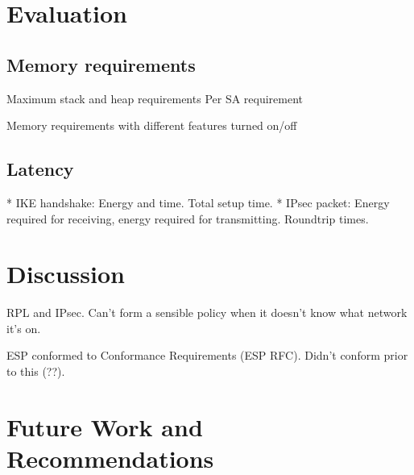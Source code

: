\documentclass[final,a4paper,twoside,11pt,onecolumn]{report}
\begin{document}
\chapter{Evaluation}
\label{cha:eval}

\section{Memory requirements}
Maximum stack and heap requirements
Per SA requirement

Memory requirements with different features turned on/off

\section{Latency}
* IKE handshake: Energy and time. Total setup time.
* IPsec packet: Energy required for receiving, energy required for transmitting. Roundtrip times.




\chapter{Discussion}
RPL and IPsec. Can't form a sensible policy when it doesn't know what network it's on.

ESP conformed to Conformance Requirements (ESP RFC). Didn't conform prior to this (??).


\chapter{Future Work and Recommendations}

\label{cha:fw}




\end{document}
